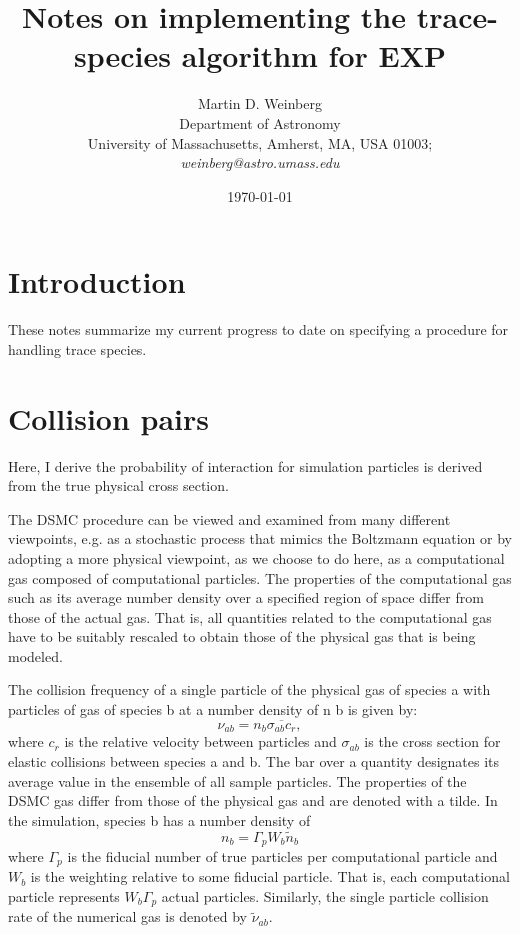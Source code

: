 \documentclass[12pt]{article}
\begin{document}
\title{Notes on implementing the trace-species algorithm for EXP}

\author{Martin D. Weinberg\\
  Department of Astronomy\\
  University of Massachusetts, Amherst, MA, USA 01003;\\
  {\it weinberg@astro.umass.edu}
}

\date{\today}

\maketitle

\tableofcontents

\section{Introduction}
\label{sec:intro}

These notes summarize my current progress to date on specifying a
procedure for handling trace species.

\section{Collision pairs}
\label{sec:background}

Here, I derive the probability of interaction for simulation particles
is derived from the true physical cross section.

The DSMC procedure can be viewed and examined from many different
viewpoints, e.g. as a stochastic process that mimics the Boltzmann
equation or by adopting a more physical viewpoint, as we choose to do
here, as a computational gas composed of computational particles. The
properties of the computational gas such as its average number density
over a specified region of space differ from those of the actual
gas. That is, all quantities related to the computational gas have to
be suitably rescaled to obtain those of the physical gas that is being
modeled. 

The
collision frequency of a single particle of the physical gas of
species a with particles of gas of species b at a number density of n
b is given by: 
\begin{equation}
  \nu_{ab} = n_b \overline{\sigma_{ab} c_r}, 
\end{equation}
where $c_r$ is the relative velocity between particles and
$\sigma_{ab}$ is the cross section for elastic collisions between
species a and b. The bar over a quantity designates its average value
in the ensemble of all sample particles. The properties of the DSMC
gas differ from those of the physical gas and are denoted with a
tilde. In the simulation, species b has a number density of
\begin{equation}
n_b = \Gamma_p W_b {\tilde n}_b
\end{equation}
where $\Gamma_p$ is the fiducial number of true particles per
computational particle and $W_b$ is the weighting relative to some
fiducial particle.  That is, each computational particle represents
$W_b\Gamma_p$ actual particles. Similarly, the single particle
collision rate of the numerical gas is denoted by ${\tilde\nu}_{ab}$.
\end{document}

